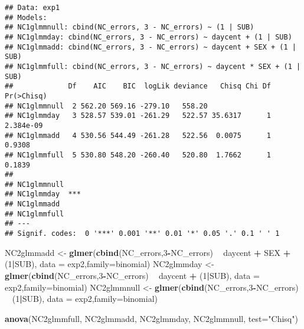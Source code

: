 \documentclass[]{article}
\newenvironment{Shaded}{\begin{snugshade}}{\end{snugshade}}
\newcommand{\KeywordTok}[1]{\textcolor[rgb]{0.13,0.29,0.53}{\textbf{#1}}}
\newcommand{\DataTypeTok}[1]{\textcolor[rgb]{0.13,0.29,0.53}{#1}}
\newcommand{\DecValTok}[1]{\textcolor[rgb]{0.00,0.00,0.81}{#1}}
\newcommand{\StringTok}[1]{\textcolor[rgb]{0.31,0.60,0.02}{#1}}
\newcommand{\OperatorTok}[1]{\textcolor[rgb]{0.81,0.36,0.00}{\textbf{#1}}}
\newcommand{\NormalTok}[1]{#1}
\begin{document}
\begin{verbatim}
## Data: exp1
## Models:
## NC1glmmnull: cbind(NC_errors, 3 - NC_errors) ~ (1 | SUB)
## NC1glmmday: cbind(NC_errors, 3 - NC_errors) ~ daycent + (1 | SUB)
## NC1glmmadd: cbind(NC_errors, 3 - NC_errors) ~ daycent + SEX + (1 | SUB)
## NC1glmmfull: cbind(NC_errors, 3 - NC_errors) ~ daycent * SEX + (1 | SUB)
##             Df    AIC    BIC  logLik deviance   Chisq Chi Df Pr(>Chisq)
## NC1glmmnull  2 562.20 569.16 -279.10   558.20                          
## NC1glmmday   3 528.57 539.01 -261.29   522.57 35.6317      1  2.384e-09
## NC1glmmadd   4 530.56 544.49 -261.28   522.56  0.0075      1     0.9308
## NC1glmmfull  5 530.80 548.20 -260.40   520.80  1.7662      1     0.1839
##                
## NC1glmmnull    
## NC1glmmday  ***
## NC1glmmadd     
## NC1glmmfull    
## ---
## Signif. codes:  0 '***' 0.001 '**' 0.01 '*' 0.05 '.' 0.1 ' ' 1
\end{verbatim}

\begin{Shaded}
\begin{Highlighting}[]
\NormalTok{NC2glmmadd <-}\StringTok{ }\KeywordTok{glmer}\NormalTok{(}\KeywordTok{cbind}\NormalTok{(NC_errors,}\DecValTok{3}\OperatorTok{-}\NormalTok{NC_errors) }\OperatorTok{~}\StringTok{ }\NormalTok{daycent }\OperatorTok{+}\StringTok{ }\NormalTok{SEX }\OperatorTok{+}\StringTok{ }\NormalTok{(}\DecValTok{1}\OperatorTok{|}\NormalTok{SUB), }\DataTypeTok{data =}\NormalTok{ exp2,}\DataTypeTok{family=}\NormalTok{binomial)}
\NormalTok{NC2glmmday <-}\StringTok{ }\KeywordTok{glmer}\NormalTok{(}\KeywordTok{cbind}\NormalTok{(NC_errors,}\DecValTok{3}\OperatorTok{-}\NormalTok{NC_errors) }\OperatorTok{~}\StringTok{ }\NormalTok{daycent }\OperatorTok{+}\StringTok{ }\NormalTok{(}\DecValTok{1}\OperatorTok{|}\NormalTok{SUB), }\DataTypeTok{data =}\NormalTok{ exp2,}\DataTypeTok{family=}\NormalTok{binomial)}
\NormalTok{NC2glmmnull <-}\StringTok{ }\KeywordTok{glmer}\NormalTok{(}\KeywordTok{cbind}\NormalTok{(NC_errors,}\DecValTok{3}\OperatorTok{-}\NormalTok{NC_errors) }\OperatorTok{~}\StringTok{ }\NormalTok{(}\DecValTok{1}\OperatorTok{|}\NormalTok{SUB), }\DataTypeTok{data =}\NormalTok{ exp2,}\DataTypeTok{family=}\NormalTok{binomial)}

\KeywordTok{anova}\NormalTok{(NC2glmmfull, NC2glmmadd, NC2glmmday, NC2glmmnull, }\DataTypeTok{test=}\StringTok{"Chisq"}\NormalTok{)}
\end{Highlighting}
\end{Shaded}
\end{document}
